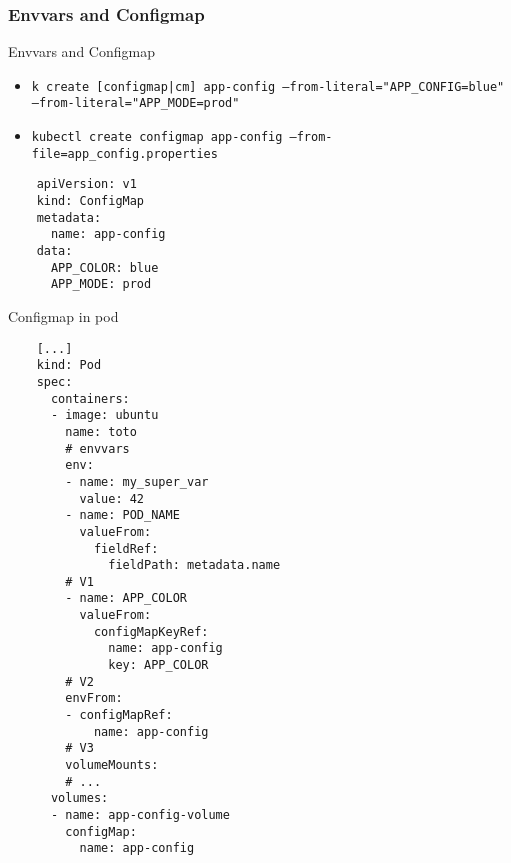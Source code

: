 
\subsubsection{Envvars and Configmap}
\begin{frame}[fragile]{Envvars and Configmap}
  \begin{itemize}
    \item \texttt{k create [configmap|cm] app-config --from-literal="APP\_CONFIG=blue" --from-literal="APP\_MODE=prod"}
    \item \texttt{kubectl create configmap app-config --from-file=app\_config.properties}
  \end{itemize}
  \begin{lstlisting}
    apiVersion: v1
    kind: ConfigMap
    metadata:
      name: app-config
    data:
      APP_COLOR: blue
      APP_MODE: prod
  \end{lstlisting}
\end{frame}

\begin{frame}[fragile]{Configmap in pod}
  \begin{lstlisting}
    [...]
    kind: Pod
    spec:
      containers:
      - image: ubuntu
        name: toto
        # envvars
        env:
        - name: my_super_var
          value: 42
        - name: POD_NAME
          valueFrom:
            fieldRef:
              fieldPath: metadata.name
        # V1
        - name: APP_COLOR
          valueFrom:
            configMapKeyRef:
              name: app-config
              key: APP_COLOR
        # V2
        envFrom:
        - configMapRef:
            name: app-config
        # V3
        volumeMounts:
        # ...
      volumes:
      - name: app-config-volume
        configMap:
          name: app-config
  \end{lstlisting}
\end{frame}
